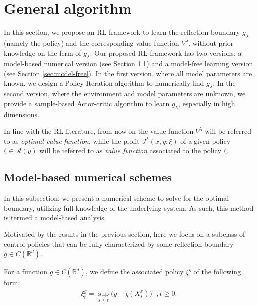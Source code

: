 \documentclass[11pt]{amsart}
\theoremstyle{plain}
\numberwithin{equation}{section}
\begin{document}
\section{General algorithm}\label{sec:general_algorithm}


In this section, we propose an RL framework to learn the reflection boundary  $g_\lambda$ (namely the policy) and the corresponding value function $V^\lambda$, without prior knowledge on the form of $g_\lambda$. Our proposed RL framework has  two versions: a model-based numerical version (see Section \ref{sec:model-based}) and a model-free learning version (see Section \ref{sec:model-free}). In the first version, where all model parameters are known, we design a Policy Iteration algorithm to numerically find $g_\lambda$. In the second version, where the environment and model parameters are unknown, we provide a sample-based Actor-critic algorithm to learn $g_\lambda$, especially in high dimensions.


 In line with the RL literature, from now on the value function $V^\lambda$ will be referred to as \textit{optimal value function}, while the profit $J^\lambda (x,y;\xi)$ of a given policy $\xi \in \mathcal A (y)$ will be referred to as  \textit{value function} associated to the policy $\xi$.


\subsection{Model-based numerical schemes}\label{sec:model-based}
In this subsection, we present a numerical scheme to solve for the optimal boundary, utilizing full knowledge of the underlying system. As such, this method is termed a model-based analysis.

Motivated by the  results in the previous section, here we focus on a subclass of control policies that can be fully characterized by some reflection boundary $g\in C(\mathbb{R}^d)$.


For a function $g\in C(\mathbb{R}^d)$, we define the associated policy $\xi^g$  of the following form:
  \begin{eqnarray}\label{eq:parameterized_policy}
      \xi^g_t = \sup_{s\leq t} \big(y-g(X_s^x)\big)^+, t \ge 0.
  \end{eqnarray}
  
\end{document}
